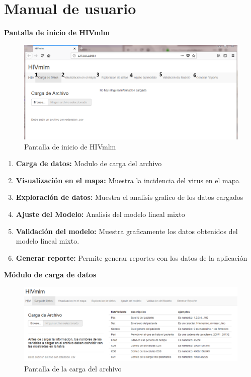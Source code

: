 \chapter{Manual de usuario}

\textbf{Pantalla de inicio de HIVmlm}
\begin{figure}[H]
\centering
\includegraphics[scale=0.5]{inicio.PNG}
\caption{Pantalla de inicio de HIVmlm}
\end{figure}

\begin{enumerate}
\item \textbf{Carga de datos:} Modulo de carga del archivo
\item \textbf{Visualizaci\'on en el mapa:} Muestra la incidencia del virus en el mapa
\item \textbf{Exploraci\'on de datos:} Muestra el analisis grafico de los datos cargados
\item \textbf{Ajuste del Modelo:} Analisis del modelo lineal mixto
\item \textbf{Validaci\'on del modelo:} Muestra graficamente los datos obtenidos del modelo lineal mixto.
\item \textbf{Generar reporte:} Permite generar reportes con los datos de la aplicaci\'on 
\end{enumerate}

 \noindent
\textbf{M\'odulo de carga de datos}

\begin{figure}[H]
\centering
\includegraphics[scale=0.5]{cargaArchivo.PNG}
\caption{Pantalla de la carga del archivo}
\end{figure}

